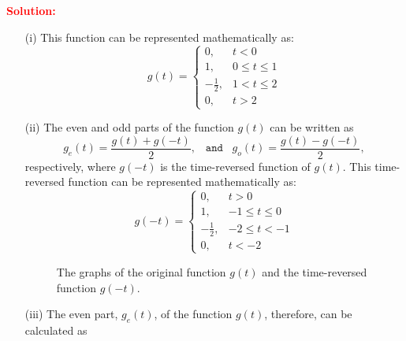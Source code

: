 \documentclass[a4paper, 12pt]{article}
\begin{document}
\begin{itemize}
\begin{itemize}
\textcolor{red}{\textbf{Solution:}}
\begin{itemize}
\item[(i)]{This function can be represented mathematically as:}
\[
\boxed{
g(t) =
\begin{cases}
0, & t < 0 \\
1, & 0 \leq t \leq 1 \\
-\frac{1}{2}, & 1 < t \leq 2 \\
0, & t > 2
\end{cases}
}
\]
\item[(ii)]{The even and odd parts  of the function $g(t)$ can be written as}
\begin{equation}
g_{e}(t) = \frac{g(t) + g(-t)}{2}, \; \; \; \mathtt{and} \; \; \; g_{o}(t) = \frac{g(t) - g(-t)}{2},
\end{equation}
respectively, where $g(-t)$ is the time-reversed function of $g(t)$. This time-reversed function can be represented mathematically as:
\[
\boxed{
g(-t) = 
\begin{cases}
0, & t > 0 \\
1, & -1 \leq t \leq 0 \\
-\frac{1}{2}, & -2 \leq t < -1 \\
0, & t < -2
\end{cases}
}
\]
\begin{figure}[h!]
\caption{\label{fig:2bFig2}The graphs of the original function $g(t)$ and the time-reversed function $g(-t)$.}
\end{figure}
\item[(iii)]{The even part, $g_{e}(t)$,  of the function $g(t)$, therefore, can be calculated as}

\end{itemize}
\end{itemize}
\end{itemize}
\end{document}
